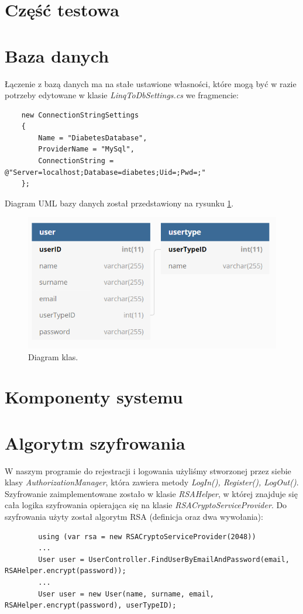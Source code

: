 \documentclass[12pt,a4paper]{article}
\begin{document}
\section*{Część testowa}


	
\section*{Baza danych}
Łączenie z bazą danych ma na stałe ustawione własności, które mogą być w razie potrzeby edytowane w klasie \emph{LinqToDbSettings.cs} we fragmencie:
	\begin{lstlisting}
	new ConnectionStringSettings
	{
		Name = "DiabetesDatabase",
		ProviderName = "MySql",
		ConnectionString = @"Server=localhost;Database=diabetes;Uid=;Pwd=;"
	};
	\end{lstlisting}


Diagram UML bazy danych został przedstawiony na rysunku \ref{fig:dbdiagram}.


\begin{figure}[h]
	\centering
	\centerline{
	\includegraphics[width=0.9\linewidth]{media/dbdiagram}
	}
	\caption{Diagram klas.}
	\label{fig:dbdiagram}
\end{figure}



\section*{Komponenty systemu}


	
\section*{Algorytm szyfrowania}
	
	
	W naszym programie do rejestracji i logowania użyliśmy stworzonej przez siebie klasy \emph{AuthorizationManager}, która zawiera metody \emph{LogIn(), Register(), LogOut()}.
	Szyfrowanie zaimplementowane zostało w klasie \emph{RSAHelper}, w której znajduje się cała logika szyfrowania opierająca się na klasie \emph{RSACryptoServiceProvider}.
	Do szyfrowania użyty został algorytm RSA (definicja oraz dwa wywołania):
	\begin{lstlisting}
		using (var rsa = new RSACryptoServiceProvider(2048))
		...
		User user = UserController.FindUserByEmailAndPassword(email, RSAHelper.encrypt(password));
		...
		User user = new User(name, surname, email, RSAHelper.encrypt(password), userTypeID);
	\end{lstlisting}
\end{document}
